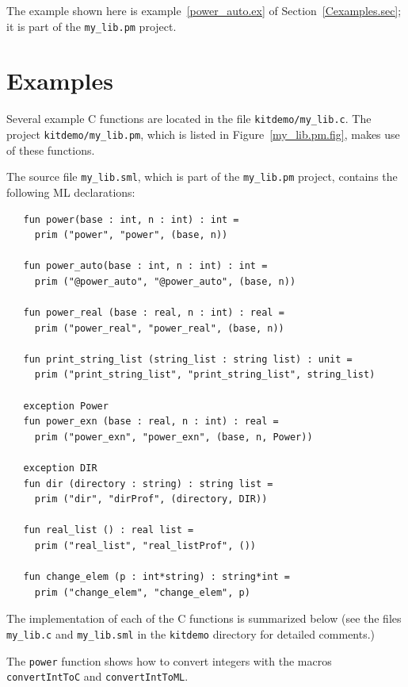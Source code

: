 \documentclass[12pt]{book}
\begin{document}
The example shown here is example~\ref{power_auto.ex} of
Section~\ref{Cexamples.sec}; it is part of the \verb|my_lib.pm|
project.

\section{Examples\label{Cexamples.sec}}
%
%
%
Several example C functions are located in the file
\verb|kitdemo/my_lib.c|. The project \verb|kitdemo/my_lib.pm|, which
is listed in Figure~\ref{my_lib.pm.fig}, makes use of these functions.

The source file \verb|my_lib.sml|, which is part of the
\verb|my_lib.pm| project, contains the following ML declarations:
\begin{verbatim}
   fun power(base : int, n : int) : int = 
     prim ("power", "power", (base, n))

   fun power_auto(base : int, n : int) : int = 
     prim ("@power_auto", "@power_auto", (base, n))

   fun power_real (base : real, n : int) : real = 
     prim ("power_real", "power_real", (base, n))

   fun print_string_list (string_list : string list) : unit = 
     prim ("print_string_list", "print_string_list", string_list)

   exception Power
   fun power_exn (base : real, n : int) : real = 
     prim ("power_exn", "power_exn", (base, n, Power))

   exception DIR
   fun dir (directory : string) : string list = 
     prim ("dir", "dirProf", (directory, DIR))

   fun real_list () : real list = 
     prim ("real_list", "real_listProf", ())

   fun change_elem (p : int*string) : string*int =
     prim ("change_elem", "change_elem", p)
\end{verbatim}

The implementation of each of the C functions is summarized below (see
the files \verb|my_lib.c| and \verb|my_lib.sml| in the {\tt kitdemo}
directory for detailed comments.)

\begin{example}\label{power.ex}
  The \texttt{power} function shows how to convert
  integers with the macros \texttt{convertIntToC} and
  \texttt{convertIntToML}.
\end{example}
\end{document}

